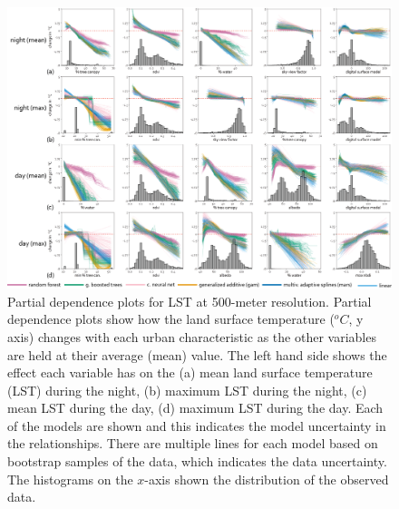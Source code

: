 \documentclass[review]{elsarticle}
\begin{document}
\begin{figure}[h]
    \centering
    \includegraphics[width=\linewidth]{fig/report/pdp_500.png}
    \caption[Partial dependence plots for LST at 500-meter resolution]{
    Partial dependence plots for LST at 500-meter resolution.
    Partial dependence plots show how the land surface temperature ($^oC$, y axis) changes with each urban characteristic as the other variables are held at their average (mean) value. 
    The left hand side shows the effect each variable has on the (a) mean land surface temperature (LST) during the night, (b) maximum LST during the night, (c) mean LST during the day, (d) maximum LST during the day. 
    Each of the models are shown and this indicates the model uncertainty in the relationships.
    There are multiple lines for each model based on bootstrap samples of the data, which indicates the data uncertainty.
    The histograms on the $x$-axis shown the distribution of the observed data.
    }
    \label{fig:pdp_500}
\end{figure}
\end{document}
